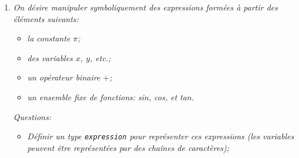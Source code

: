 \documentclass[a4paper]{article}
\begin{document}
\begin{enumerate}
La troisième valeur est une fonction qui prend un \texttt{x} et le
passe à la fonction \texttt{f}. Le type de \texttt{x} est donc le
domaine de \texttt{f}. Soit $\alpha$ ce type. La fonction \texttt{f}
prend un \texttt{y} (de type $\alpha$, donc) et l'ajoute à
\texttt{x}. Or l'opérateur plus \texttt{(+)} a pour type $\texttt{int}
\rightarrow \texttt{int} \rightarrow \texttt{int}$. Par conséquent
\texttt{x} et \texttt{y} sont de type \texttt{int}, en particulier
$\alpha = \texttt{int}$, et le type de \texttt{f} est $\texttt{int}
\rightarrow \texttt{int}$. Donc \texttt{f(x)} a pour type
\texttt{int}. Finalement, la fonction proposée a pour type
$\texttt{int} \rightarrow \texttt{int}$.

La quatrième expression repose sur \texttt{List.map} qui a pour type
$(\alpha \rightarrow \beta) \rightarrow \alpha \, \texttt{list}
\rightarrow \beta \, \texttt{list}$. Or on l'évalue partiellement en
son premier argument avec une fonction dont le type est $\texttt{bool}
\rightarrow \texttt{bool}$. Donc $\alpha = \beta = \texttt{bool}$. Il
reste donc finalement le type $\texttt{bool list} \rightarrow
\texttt{bool list}$.

\item \emph{On désire manipuler symboliquement des expressions formées
      à partir des éléments suivants:}

      \begin{itemize}
        \item \emph{la constante $\pi$;}
        \item \emph{des variables $x$, $y$, etc.;}
        \item \emph{un opérateur binaire $+$;}
        \item \emph{un ensemble fixe de fonctions: sin, cos, et tan.}
      \end{itemize}

      \emph{Questions:}

      \begin{itemize}
        \item \emph{Définir un type {\tt expression} pour représenter
        ces expressions (les variables peuvent être représentées par
        des chaînes de caractères);}

              \medskip


\end{itemize}
\end{enumerate}
\end{document}
